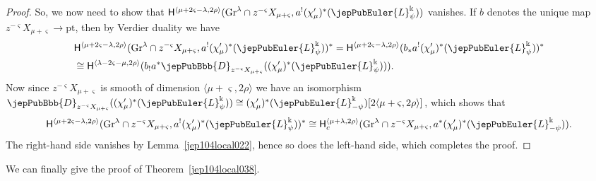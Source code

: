 \begin{proof}
So, we now need to show that $\mathsf{H}^{\langle\mu+2\varsigma-\lambda,2\rho\rangle}(\mathrm{Gr}^\lambda\cap z^{-\varsigma}X_{\mu+\varsigma},a^!(\chi'_\mu)^*(\jepPubEuler{L}^\Bbbk_\psi))$ vanishes. If $b$ denotes the unique map $z^{-\varsigma}X_{\mu+\varsigma}\to\mathrm{pt}$, then by Verdier duality we have
\begin{align*}
&\mathsf{H}^{\langle\mu+2\varsigma-\lambda,2\rho\rangle}(\mathrm{Gr}^\lambda\cap z^{-\varsigma}X_{\mu+\varsigma},a^!(\chi'_\mu)^*(\jepPubEuler{L}^\Bbbk_\psi))^*
=\mathsf{H}^{\langle\mu+2\varsigma-\lambda,2\rho\rangle}(b_*a^!(\chi'_\mu)^*(\jepPubEuler{L}^\Bbbk_\psi))^*\\
&\cong\mathsf{H}^{\langle\lambda-2\varsigma-\mu,2\rho\rangle}(b_!a^*\jepPubBbb{D}_{z^{-\varsigma}X_{\mu+\varsigma}}((\chi'_\mu)^*(\jepPubEuler{L}^\Bbbk_\psi))).
\end{align*}
Now since $z^{-\varsigma}X_{\mu+\varsigma}$ is smooth of dimension $\langle\mu+\varsigma,2\rho\rangle$ we have an isomorphism
$\jepPubBbb{D}_{z^{-\varsigma}X_{\mu+\varsigma}}((\chi'_\mu)^*(\jepPubEuler{L}^\Bbbk_\psi))\cong(\chi'_\mu)^*(\jepPubEuler{L}^\Bbbk_{-\psi})[2\langle\mu+\varsigma,2\rho\rangle]$, which shows that
\[
\mathsf{H}^{\langle\mu+2\varsigma-\lambda,2\rho\rangle}(\mathrm{Gr}^\lambda\cap z^{-\varsigma}X_{\mu+\varsigma},a^!(\chi'_\mu)^*(\jepPubEuler{L}^\Bbbk_\psi))^*
\cong\mathsf{H}^{\langle\mu+\lambda,2\rho\rangle}_c(\mathrm{Gr}^\lambda\cap z^{-\varsigma}X_{\mu+\varsigma},a^*(\chi'_\mu)^*(\jepPubEuler{L}^\Bbbk_{-\psi})).
\]
The right-hand side vanishes by Lemma~\ref{jep104local022}, hence so does the left-hand side, which completes the proof.
\end{proof}

We can finally give the proof of Theorem~\ref{jep104local038}.

